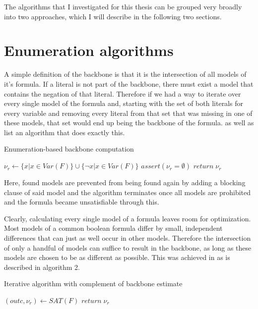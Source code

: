 The algorithms that I investigated for this thesis can be grouped very broadly into two approaches, which I will describe in the following two sections.


\section{Enumeration algorithms}
A simple definition of the backbone is that it is the intersection of all models of it's formula. If a literal is not part of the backbone, there must exist a model that contains the negation of that literal. Therefore if we had a way to iterate over every single model of the formula and, starting with the set of both literals for every variable and removing every literal from that set that was missing in one of these models, that set would end up being the backbone of the formula. \cite{mjl10} as well as \cite{mjl15} list an algorithm that does exactly this. 

\begin{algorithm} %
\caption{{\sc Enumeration-based backbone computation}}
\DontPrintSemicolon
{}
$\nu_r \gets \{ x | x \in Var(F) \} \cup \{ \neg x | x \in Var(F) \}$\;
$assert(\nu_r = \emptyset)$\;
$return\; \nu_r$\;
\end{algorithm}

Here, found models are prevented from being found again by adding a blocking clause of said model and the algorithm terminates once all models are prohibited and the formula became unsatisfiable through this.

Clearly, calculating every single model of a formula leaves room for optimization. Most models of a common boolean formula differ by small, independent differences that can just as well occur in other models. Therefore the intersection of only a handful of models can suffice to result in the backbone, as long as these models are chosen to be as different as possible. This was achieved in \cite{mjl15} as is described in algorithm 2.

\begin{algorithm}
\caption{{\sc Iterative algorithm with complement of backbone estimate}}
\DontPrintSemicolon
{}
$(outc,\nu_r) \gets SAT(F)$\;
$return \; \nu_r$\;
\end{algorithm}

